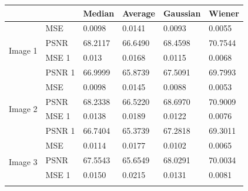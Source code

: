 \begin{center}
\begin{tabular}{|l|l|l|l|l|l|l|l|l|l|}
\hline
\multicolumn{2}{|l|}{}            & \multicolumn{2}{l|}{Median}  & \multicolumn{2}{l|}{Average} & \multicolumn{2}{l|}{Gaussian} & \multicolumn{2}{l|}{Wiener}  \\ \hline
\multirow{4}{*}{Image 1} & MSE    & \multicolumn{2}{l|}{0.0098}  & \multicolumn{2}{l|}{0.0141}  & \multicolumn{2}{l|}{0.0093}   & \multicolumn{2}{l|}{0.0055}  \\ \cline{2-10} 
                         & PSNR   & \multicolumn{2}{l|}{68.2117} & \multicolumn{2}{l|}{66.6490} & \multicolumn{2}{l|}{68.4598}  & \multicolumn{2}{l|}{70.7544} \\ \cline{2-10} 
                         & MSE 1  & \multicolumn{2}{l|}{0.013}   & \multicolumn{2}{l|}{0.0168}  & \multicolumn{2}{l|}{0.0115}   & \multicolumn{2}{l|}{0.0068}  \\ \cline{2-10} 
                         & PSNR 1 & \multicolumn{2}{l|}{66.9999} & \multicolumn{2}{l|}{65.8739} & \multicolumn{2}{l|}{67.5091}  & \multicolumn{2}{l|}{69.7993} \\ \hline
\multirow{4}{*}{Image 2} & MSE    & \multicolumn{2}{l|}{0.0098}  & \multicolumn{2}{l|}{0.0145}  & \multicolumn{2}{l|}{0.0088}   & \multicolumn{2}{l|}{0.0053}  \\ \cline{2-10} 
                         & PSNR   & \multicolumn{2}{l|}{68.2338} & \multicolumn{2}{l|}{66.5220} & \multicolumn{2}{l|}{68.6970}  & \multicolumn{2}{l|}{70.9009} \\ \cline{2-10} 
                         & MSE 1  & \multicolumn{2}{l|}{0.0138}  & \multicolumn{2}{l|}{0.0189}  & \multicolumn{2}{l|}{0.0122}   & \multicolumn{2}{l|}{0.0076}  \\ \cline{2-10} 
                         & PSNR 1 & \multicolumn{2}{l|}{66.7404} & \multicolumn{2}{l|}{65.3739} & \multicolumn{2}{l|}{67.2818}  & \multicolumn{2}{l|}{69.3011} \\ \hline
\multirow{4}{*}{Image 3} & MSE    & \multicolumn{2}{l|}{0.0114}  & \multicolumn{2}{l|}{0.0177}  & \multicolumn{2}{l|}{0.0102}   & \multicolumn{2}{l|}{0.0065}  \\ \cline{2-10} 
                         & PSNR   & \multicolumn{2}{l|}{67.5543} & \multicolumn{2}{l|}{65.6549} & \multicolumn{2}{l|}{68.0291}  & \multicolumn{2}{l|}{70.0034} \\ \cline{2-10} 
                         & MSE 1  & \multicolumn{2}{l|}{0.0150}  & \multicolumn{2}{l|}{0.0215}  & \multicolumn{2}{l|}{0.0131}   & \multicolumn{2}{l|}{0.0081}  \\ \cline{2-10} 

\end{tabular}
\end{center}
